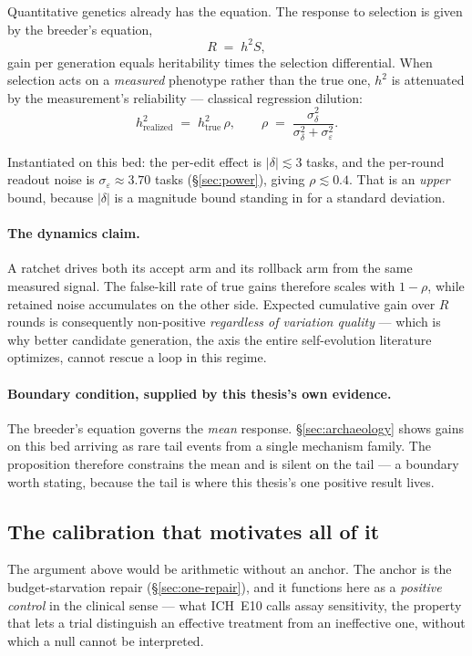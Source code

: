 Quantitative genetics already has the equation. The response to selection
is given by the breeder's equation,
\[
  R \;=\; h^2 S ,
\]
gain per generation equals heritability times the selection differential.
When selection acts on a \emph{measured} phenotype rather than the true
one, $h^2$ is attenuated by the measurement's reliability --- classical
regression dilution:
\[
  h^2_{\text{realized}} \;=\; h^2_{\text{true}}\,\rho ,
  \qquad
  \rho \;=\; \frac{\sigma^2_{\delta}}{\sigma^2_{\delta}+\sigma^2_{\varepsilon}} .
\]

Instantiated on this bed: the per-edit effect is $|\delta| \lesssim 3$
tasks, and the per-round readout noise is $\sigma_\varepsilon \approx
3.70$ tasks (\S\ref{sec:power}), giving $\rho \lesssim 0.4$. That is
an \emph{upper} bound, because $|\delta|$ is a magnitude bound standing in
for a standard deviation.

\paragraph{The dynamics claim.} A ratchet drives both its accept arm and
its rollback arm from the same measured signal. The false-kill rate of true
gains therefore scales with $1-\rho$, while retained noise accumulates on
the other side. Expected cumulative gain over $R$ rounds is consequently
non-positive \emph{regardless of variation quality} --- which is why better
candidate generation, the axis the entire self-evolution literature
optimizes, cannot rescue a loop in this regime.

\paragraph{Boundary condition, supplied by this thesis's own evidence.} The
breeder's equation governs the \emph{mean} response.
\S\ref{sec:archaeology} shows gains on this bed arriving as rare tail
events from a single mechanism family. The proposition therefore constrains
the mean and is silent on the tail --- a boundary worth stating, because
the tail is where this thesis's one positive result lives.

\subsection*{The calibration that motivates all of it}

The argument above would be arithmetic without an anchor. The anchor is the
budget-starvation repair (\S\ref{sec:one-repair}), and it functions here as
a \emph{positive control} in the clinical sense --- what ICH~E10 calls
assay sensitivity, the property that lets a trial distinguish an effective
treatment from an ineffective one, without which a null cannot be
interpreted.

